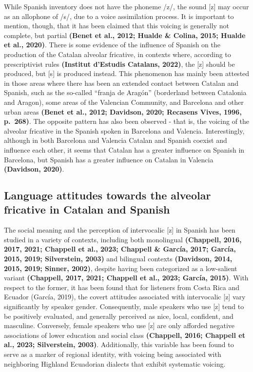 \documentclass[
  a4paper,
  11pt,
  twocolumn]{article}
\begin{document}
While Spanish inventory does not have the phoneme /z/, the sound {[}z{]}
may occur as an allophone of /s/, due to a voice assimilation process.
It is important to mention, though, that it has been claimed that this
voicing is generally not complete, but partial \textbf{(Benet et al.,
2012; Hualde \& Colina, 2015; Hualde et al., 2020)}. There is some
evidence of the influence of Spanish on the production of the Catalan
alveolar fricative, in contexts where, according to prescriptivist rules
\textbf{(Institut d'Estudis Catalans, 2022)}, the {[}z{]} should be
produced, but {[}s{]} is produced instead. This phenomenon has mainly
been attested in those areas where there has been an extended contact
between Catalan and Spanish, such as the so-called ``franja de Aragón''
(borderland between Catalonia and Aragon), some areas of the Valencian
Community, and Barcelona and other urban areas \textbf{(Benet et al.,
2012; Davidson, 2020; Recasens Vives, 1996, p.~268)}. The opposite
pattern has also been observed - that is, the voicing of the alveolar
fricative in the Spanish spoken in Barcelona and Valencia.
Interestingly, although in both Barcelona and Valencia Catalan and
Spanish coexist and influence each other, it seems that Catalan has a
greater influence on Spanish in Barcelona, but Spanish has a greater
influence on Catalan in Valencia \textbf{(Davidson, 2020)}.

\subsection{Language attitudes towards the alveolar fricative in Catalan and Spanish}

The social meaning and the perception of intervocalic {[}z{]} in Spanish
has been studied in a variety of contexts, including both monolingual
\textbf{(Chappell, 2016, 2017, 2021; Chappell et al., 2023; Chappell \&
García, 2017; García, 2015, 2019; Silverstein, 2003)} and bilingual
contexts \textbf{(Davidson, 2014, 2015, 2019; Sinner, 2002)}, despite
having been categorized as a low-salient variant \textbf{(Chappell,
2017, 2021; Chappell et al., 2023; García, 2015)}. With respect to the
former, it has been found that for listeners from Costa Rica and Ecuador
(García, 2019), the covert attitudes associated with intervocalic
{[}z{]} vary significantly by speaker gender. Consequently, male
speakers who use {[}z{]} tend to be positively evaluated, and generally
perceived as nice, local, confident, and masculine. Conversely, female
speakers who use {[}z{]} are only afforded negative associations of
lower education and social class \textbf{(Chappell, 2016; Chappell et
al., 2023; Silverstein, 2003)}. Additionally, this variable has been
found to serve as a marker of regional identity, with voicing being
associated with neighboring Highland Ecuadorian dialects that exhibit
systematic voicing.
\end{document}
